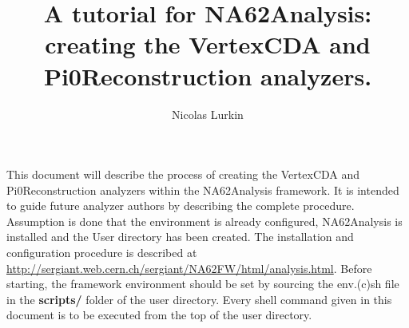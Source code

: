 \documentclass{article}
\title{A tutorial for NA62Analysis: creating the VertexCDA and
Pi0Reconstruction analyzers.}
\author{Nicolas Lurkin}
\renewcommand{\path}[1]{\textbf{#1}}
\begin{document}
\maketitle
\footnotesize
This document will describe the process of creating the VertexCDA and
Pi0Reconstruction analyzers within the NA62Analysis framework. It is intended to
guide future analyzer authors by describing the complete procedure. Assumption
is done that the environment is already configured, NA62Analysis is installed
and the User directory has been created. The installation and configuration
procedure is described at
\url{http://sergiant.web.cern.ch/sergiant/NA62FW/html/analysis.html}.
Before starting, the framework environment should be set by sourcing the
env.(c)sh file in the \path{scripts/} folder of the user directory. Every shell command
given in this document is to be executed from the top of the user directory.




\end{document}
